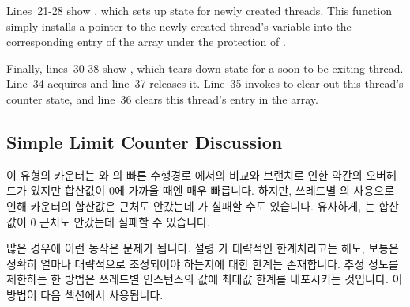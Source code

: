 Lines~21-28 show , which sets up state for
newly created threads.
This function simply installs
a pointer to the newly created thread's  variable into
the corresponding entry of the  array under the protection
of .

Finally, lines~30-38 show , which tears down
state for a soon-to-be-exiting thread.
Line~34 acquires  and line~37 releases it.
Line~35 invokes  to clear out this thread's
counter state, and line~36 clears this thread's entry in the
 array.
\fi

\subsection{Simple Limit Counter Discussion}
\label{sec:count:Simple Limit Counter Discussion}

이 유형의 카운터는  와  의 빠른 수행경로 에서의
비교와 브랜치로 인한 약간의 오버헤드가 있지만 합산값이 0에 가까울 때엔 매우
빠릅니다.
하지만, 쓰레드별  의 사용으로 인해 카운터의 합산값은
 근처도 안갔는데  가 실패할 수도 있습니다.
유사하게,  는 합산값이 0 근처도 안갔는데 실패할 수 있습니다.

많은 경우에 이런 동작은 문제가 됩니다.
설령  가 대략적인 한계치라고는 해도, 보통은 정확히 얼마나
대략적으로 조정되어야 하는지에 대한 한계는 존재합니다.
추정 정도를 제한하는 한 방법은 쓰레드별  인스턴스의 값에 최대값
한계를 내포시키는 것입니다.
이 방법이 다음 섹션에서 사용됩니다.


